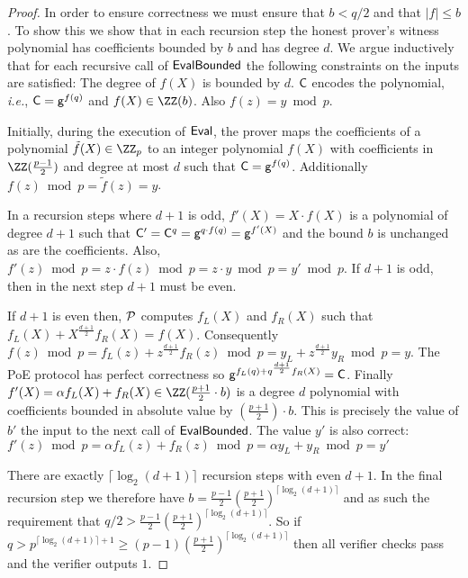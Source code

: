 \begin{proof}
In order to ensure correctness we must ensure that $b< q/2$ and that $|f|\leq b$. To show this we show that in each recursion step the honest prover's witness polynomial has coefficients bounded by $b$ and has degree $d$. 
We argue inductively that for each recursive call of $\textsf{{EvalBounded}}$ the following constraints on the inputs are satisfied: The degree of $f(X)$ is bounded by $d$. $\mathsf{C}$ encodes the polynomial, \emph{i.e.}, $\mathsf{C}=\mathsf{g}^{f(q)}$ and $f(X)\in \ZZ(b)$. Also $f(z) = y\bmod p$.

Initially, during the execution of $\textsf{{Eval}}$, the prover maps the coefficients of a polynomial $\tilde{f}(X)\in \ZZ_p$ to an integer polynomial $f(X)$ with coefficients in $\ZZ(\frac{p-1}{2})$ and degree at most $d$ such that $\mathsf{C}=\mathsf{g}^{f(q)}$. Additionally $f(z)\bmod p=\tilde{f}(z)=y$.

 In a recursion steps where $d+1$ is odd, $f'(X)=X\cdot f(X)$ is a polynomial of degree $d+1$ such that $\mathsf{C}'=\mathsf{C}^q=\mathsf{g}^{q\cdot f(q)}=\mathsf{g}^{f'(X)}$ and the bound $b$ is unchanged as are the coefficients. Also, $f'(z)\bmod p = z \cdot f(z) \bmod p=z\cdot y\bmod p = y' \bmod p$. If $d+1$ is odd, then in the next step $d+1$ must be even.
 
 If $d+1$ is even then, $\mathcal{P}$ computes $f_L(X)$ and $f_R(X)$ such that $f_L(X)+X^{\frac{d+1}{2}} f_R(X)=f(X)$. Consequently $f(z) \bmod p=f_L(z)+ z^{\frac{d+1}{2}} f_R(z)\bmod p=y_L+z^{\frac{d+1}{2}}  y_R\bmod p =y$. The \textsf{PoE} protocol has perfect correctness so {$\mathsf{g}^{f_L(q)+q^{\frac{d+1}{2}} f_R(X)}=\mathsf{C}$}.
 Finally $f'(X)=\alpha f_L(X) + f_R(X)\in \ZZ(\frac{p+1}{2}\cdot b)$ is a degree $d$ polynomial with coefficients bounded in absolute value by $(\frac{p+1}{2})\cdot b$. This is precisely the value of $b'$ the input to the next call of $\textsf{{EvalBounded}}$. The value $y'$ is also correct:
$f'(z)\bmod p=\alpha f_L(z) +f_R(z) \bmod p= \alpha y_L +y_R\bmod p=y'$
 
 There are exactly $\lceil\log_2(d+1)\rceil$ recursion steps with even $d+1$. In the final recursion step we therefore have $b=\frac{p-1}{2}(\frac{p+1}{2})^{\lceil\log_2(d+1)\rceil}$ and as such the requirement that $q/2>\frac{p-1}{2}(\frac{p+1}{2})^{\lceil\log_2(d+1)\rceil}$. 
 So if $q>p^{\lceil\log_2(d+1)\rceil+1}\geq (p-1) (\frac{p+1}{2})^{\lceil \log_2(d+1)\rceil}$ then all verifier checks pass and the verifier outputs $1$.
\end{proof} 


